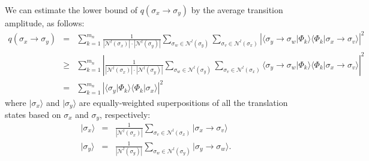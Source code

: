 \documentclass[10pt, letterpaper]{article}
\begin{document}
We can estimate the lower bound of $q(\sigma_x\to\sigma_y)$ by the average transition amplitude, as follows:
\begin{eqnarray}
q(\sigma_x\to\sigma_y) &=& \sum_{k=1}^{m_n} \frac{1}{\left|\mathcal{N}^{l}(\sigma_x)\right| \cdot \left|\mathcal{N}^{l}(\sigma_y)\right|} \sum_{\sigma_w\in \mathcal{N}^{l}(\sigma_y)} \sum_{\sigma_v\in \mathcal{N}^{l}(\sigma_x)} \left| \langle\sigma_y\to\sigma_w \vert \Phi_{k}\rangle \langle\Phi_{k} \vert \sigma_x\to\sigma_v\rangle \right|^2 \nonumber \\
&\geq& \sum_{k=1}^{m_n} \left| \frac{1}{\left|\mathcal{N}^{l}(\sigma_x)\right| \cdot \left|\mathcal{N}^{l}(\sigma_y)\right|} \sum_{\sigma_w\in \mathcal{N}^{l}(\sigma_y)} \sum_{\sigma_v\in \mathcal{N}^{l}(\sigma_x)} \langle\sigma_y\to\sigma_w \vert \Phi_{k}\rangle \langle\Phi_{k} \vert \sigma_x\to\sigma_v\rangle \right|^2 \nonumber \\
&=& \sum_{k=1}^{m_n} \left| \langle\sigma_y\vert \Phi_{k}\rangle \langle\Phi_{k} \vert\sigma_x\rangle \right|^2
\end{eqnarray}
where $\vert\sigma_x\rangle$ and $\vert\sigma_y\rangle$ are equally-weighted superpositions of all the translation states based on $\sigma_x$ and $\sigma_y$, respectively:
\begin{eqnarray}
\vert\sigma_x\rangle &=& \frac{1}{\left|\mathcal{N}^{l}(\sigma_x)\right|} \sum_{\sigma_v\in \mathcal{N}^{l}(\sigma_x)} \vert\sigma_x\to\sigma_v\rangle \nonumber \\
\vert\sigma_y\rangle &=& \frac{1}{\left|\mathcal{N}^{l}(\sigma_y)\right|} \sum_{\sigma_w\in \mathcal{N}^{l}(\sigma_y)} \vert\sigma_y\to\sigma_w\rangle.
\end{eqnarray}
\end{document}
